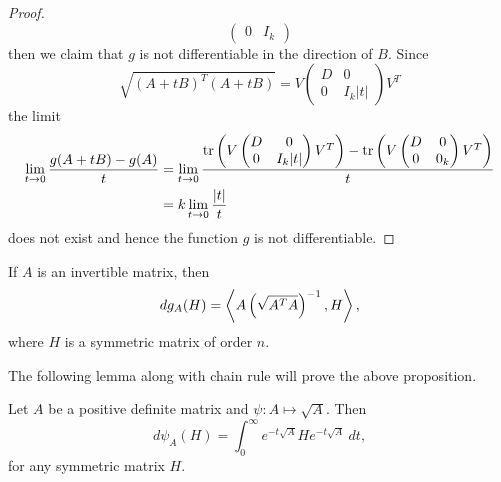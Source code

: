 \begin{proof}
\begin{displaymath}
\begin{pmatrix}
            0 & I_k
        \end{pmatrix}    
    \end{displaymath}
    then we claim that $g$ is not differentiable in the direction of $B$. Since 
    \begin{displaymath}
        \sqrt{(A+tB)^T(A+tB)} = V \begin{pmatrix}
            D & 0 \\
            0 & I_k|t|
        \end{pmatrix} V^T
    \end{displaymath}
    the limit 
    \begin{align*}
        \lim_{t\to 0} \dfrac{g(A+tB) - g(A)}{t} & = \lim_{t\to 0} \dfrac{\mathrm{tr}\left( V\begin{pmatrix}
            D & 0 \\
            0 & I_k|t|
        \end{pmatrix} V^T \right) - \mathrm{tr}\left( V \begin{pmatrix}
            D & 0 \\
            0 & 0_k
        \end{pmatrix} V^T \right)}{t}\\
        & = k \lim_{t\to 0} \dfrac{|t|}{t} 
    \end{align*}
    does not exist and hence the function $g$ is not differentiable.
\end{proof}

\begin{prop}\label{prop:derivativeOfSqrtMatrixMap}
    If $A$ is an invertible matrix, then 
    \begin{equation}\label{derivativeOfSquareRoot}
        dg_A(H) = \left\langle A\left( \sqrt{A^TA} \right)^{-1},H\right\rangle,
    \end{equation}
    where $H$ is a symmetric matrix of order $n$.
\end{prop}

\vspace{0.3cm}
\noindent The following lemma along with chain rule will prove the above proposition. 
\begin{lemma} \label{lem:derivativeOfSquareRoot}
    Let $A$ be a positive definite matrix and $\psi:A\mapsto \sqrt{A}$. Then 
    \begin{equation*}\label{eq: sqrtderivative}
        d\psi_A(H) = \int_0^\infty e^{-t\sqrt{A}}He^{-t\sqrt{A}}~dt,
    \end{equation*}
    for any symmetric matrix $H.$
\end{lemma}


